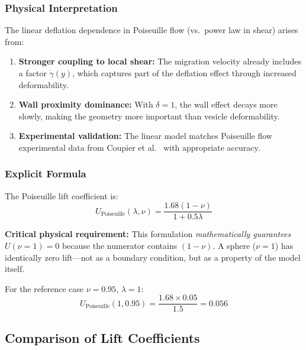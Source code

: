 \documentclass{article}
\begin{document}
\subsubsection{Physical Interpretation}

The linear deflation dependence in Poiseuille flow (vs.~power law in shear) arises from:

\begin{enumerate}
    \item \textbf{Stronger coupling to local shear:} The migration velocity already includes a factor $\dot{\gamma}(y)$, which captures part of the deflation effect through increased deformability.
    
    \item \textbf{Wall proximity dominance:} With $\delta = 1$, the wall effect decays more slowly, making the geometry more important than vesicle deformability.
    
    \item \textbf{Experimental validation:} The linear model matches Poiseuille flow experimental data from Coupier et al.~\cite{coupier2009} with appropriate accuracy.
\end{enumerate}

\subsubsection{Explicit Formula}

The Poiseuille lift coefficient is:
\begin{equation}
    U_{\text{Poiseuille}}(\lambda, \nu) = \frac{1.68(1 - \nu)}{1 + 0.5\lambda}
    \label{eq:lift_poiseuille_explicit}
\end{equation}

\textbf{Critical physical requirement:} This formulation \emph{mathematically guarantees} $U(\nu=1) = 0$ because the numerator contains $(1-\nu)$. A sphere ($\nu = 1$) has identically zero lift---not as a boundary condition, but as a property of the model itself.

For the reference case $\nu = 0.95$, $\lambda = 1$:
\begin{equation}
    U_{\text{Poiseuille}}(1, 0.95) = \frac{1.68 \times 0.05}{1.5} = 0.056
\end{equation}

\subsection{Comparison of Lift Coefficients}
\end{document}
